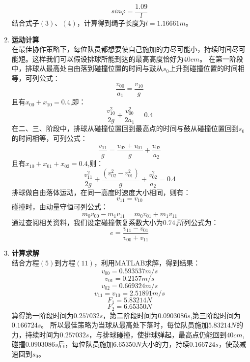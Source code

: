 \documentclass{cumcm}
\begin{document}
\begin{enumerate}
\begin{equation}
sin\varphi=\frac{1.09}{l}
\end{equation}
结合式子$(3)$、$(4)$，计算得到绳子长度为$l=1.16661m$。
\item \textbf{运动计算}\\
在最佳协作策略下，每位队员都想要使自己施加的力尽可能小，持续时间尽可能短。这样我们可以假设排球所能到达的最高高度恰好为$40cm$。
在第一阶段中，排球从最高处自由落到碰撞位置的时间与鼓从$s_0$上升到碰撞位置的时间相等，可列公式：
\begin{equation}
\frac{v_{00}}{a_1}=\frac{v_{10}}{g}
\end{equation}
且有$x_{00}+x_{10}=0.4$,即：
\begin{equation}
\frac{v^2_{10}}{2g}+\frac{v^2_{00}}{2a_1}=0.4
\end{equation}
在二、三、阶段中，排球从碰撞位置回到最高点的时间与鼓从碰撞位置回到$s_0$的时间相等，可列公式：
\begin{equation}
\frac{v_{11}}{g}=\frac{v_{02}+v_{01}}{g}+\frac{v_{02}}{a_2}
\end{equation}
且有$x_{10}+x_{01}+x_{02}=0.4$,则：
\begin{equation}
\frac{v^2_{11}}{2g}+\frac{(v^2_{02}-v^2_{01})}{g}+\frac{v^2_{02}}{a_2}=0.4
\end{equation}
排球做自由落体运动，在同一高度时速度大小相同，则有：
\begin{equation}
v_{11}=v_{10}
\end{equation}
碰撞时，由动量守恒可列公式：
\begin{equation}
m_0v_{00}-m_1v_{11}=m_0v_{01}+m_1v_{11}
\end{equation}
通过查阅相关资料，我们设定碰撞恢复系数大小为$0.74$,所列公式为：
\begin{equation}
e=\frac{v_{11}-v_{01}}{v_{00}+v_{11}}
\end{equation}


\item \textbf{计算求解}\\
结合方程$(5)$到方程$(11)$，利用MATLAB求解，得到结果：
$$v_{00}=0.593537m/s$$
$$v_{01}=0.2157m/s$$
$$v_{02}=0.669324m/s$$
$$v_{11}=v_{10}=2.51891m/s$$
$$F_1=5.83214N$$
$$F_2=6.65350N$$
\quad \quad
算得第一阶段时间为$0.257032s$，第二阶段时间为$0.0903086s$,第三阶段时间为$0.166724s$。
所以最佳策略为当球从最高处下落时，每位队员施加$5.83214N$的力，持续时间为$0.257032s$，与排球碰撞，使排球弹起，最高点仍能回到$40cm$,碰撞$0.0903086s$后，每位队员施加$6.65350N$大小的力，持续$0.166724s$，使鼓减速回到$s_0$。

\end{enumerate}
\end{document}
